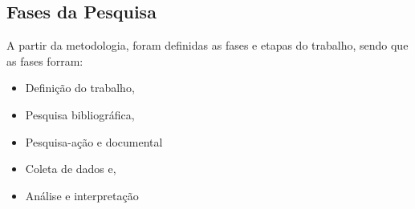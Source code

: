 \subsection{Fases da Pesquisa}

A partir da metodologia, foram definidas as fases e etapas do trabalho, sendo que as fases forram:

\begin{itemize}
	\item Definição do trabalho,
	\item Pesquisa bibliográfica,
	\item Pesquisa-ação e documental
	\item Coleta de dados e,
	\item Análise e interpretação
\end{itemize}

